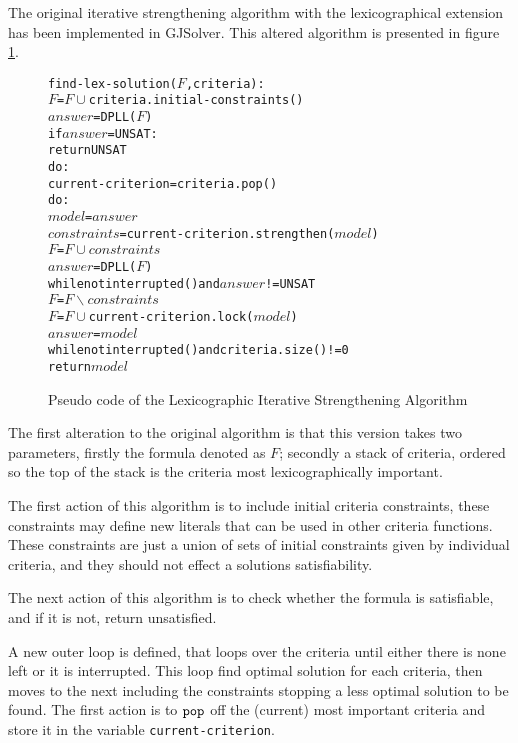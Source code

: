The original iterative strengthening algorithm with the lexicographical extension has been implemented in GJSolver. 
This altered algorithm is presented in figure \ref{impl.lexstrength}.

\begin{figure}[htp]
\begin{center}
\begin{alltt}
find-lex-solution(\(F\),criteria):
    \(F\) = \(F \cup \) criteria.initial-constraints()
    \(answer\) = DPLL(\(F\))
    if \(answer\) = UNSAT:
        return UNSAT
    do:
        current-criterion = criteria.pop()
        do:
            \(model\) = \(answer\)
            \(constraints\) = current-criterion.strengthen(\(model\))
            \(F\) = \(F \cup constraints\)
            \(answer\) = DPLL(\(F\))
        while not interrupted() and \(answer\) != UNSAT
        \(F\) = \(F \backslash constraints\)
        \(F\) = \(F \cup \) current-criterion.lock(\(model\))
        \(answer\) = \(model\)
    while not interrupted() and criteria.size() != 0
    return \(model\) 
\end{alltt}
  \caption{Pseudo code of the Lexicographic Iterative Strengthening Algorithm}
  \label{impl.lexstrength}
\end{center}
\end{figure}

The first alteration to the original algorithm is that this version takes two parameters, firstly the formula denoted as $F$;
secondly a stack of criteria, ordered so the top of the stack is the criteria most lexicographically important.

The first action of this algorithm is to include initial criteria constraints,
these constraints may define new literals that can be used in other criteria functions.
These constraints are just a union of sets of initial constraints given by individual criteria, and they should not effect a solutions satisfiability. 

The next action of this algorithm is to check whether the formula is satisfiable,
and if it is not, return unsatisfied.

A new outer loop is defined, that loops over the criteria until either there is none left or it is interrupted.
This loop find optimal solution for each criteria, then moves to the next including the constraints stopping a less optimal solution to be found.
The first action is to $\verb+pop+$ off the (current) most important criteria and store it in the variable \verb+current-criterion+.

